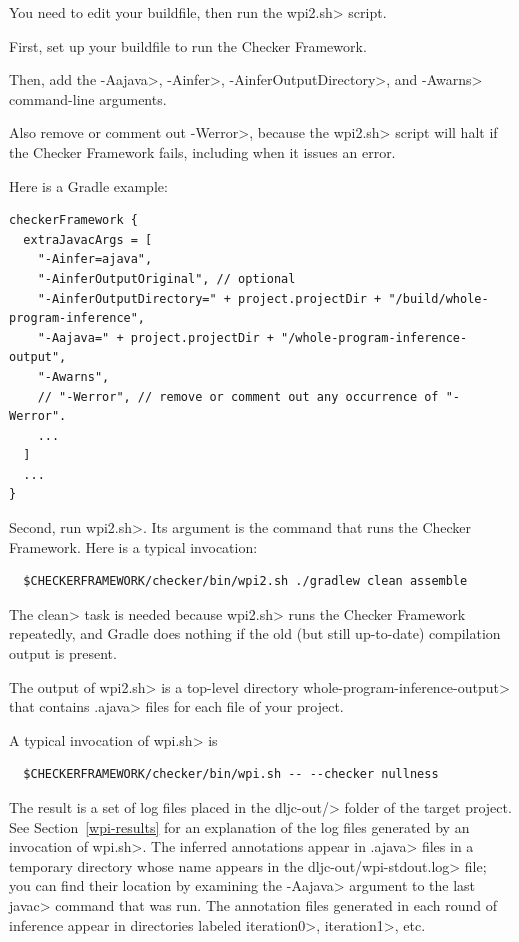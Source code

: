 You need to edit your buildfile, then run the \<wpi2.sh> script.



First, set up your buildfile to run the Checker Framework.

Then, add the
\<-Aajava>,
\<-Ainfer>,
\<-AinferOutputDirectory>, and
\<-Awarns> command-line arguments.

Also remove or comment out \<-Werror>, because the
\<wpi2.sh> script will halt if the Checker Framework fails, including when it
issues an error.

Here is a Gradle example:

\begin{Verbatim}
checkerFramework {
  extraJavacArgs = [
    "-Ainfer=ajava",
    "-AinferOutputOriginal", // optional
    "-AinferOutputDirectory=" + project.projectDir + "/build/whole-program-inference",
    "-Aajava=" + project.projectDir + "/whole-program-inference-output",
    "-Awarns",
    // "-Werror", // remove or comment out any occurrence of "-Werror".
    ...
  ]
  ...
}
\end{Verbatim}



Second, run \<wpi2.sh>.  Its argument is the command that runs the Checker Framework.
Here is a typical invocation:

\begin{Verbatim}
  $CHECKERFRAMEWORK/checker/bin/wpi2.sh ./gradlew clean assemble
\end{Verbatim}

The \<clean> task is needed because \<wpi2.sh> runs the Checker Framework
repeatedly, and Gradle does nothing if the old (but still up-to-date)
compilation output is present.

The output of \<wpi2.sh> is a top-level directory
\<whole-program-inference-output> that contains \<.ajava> files for each file of
your project.



A typical invocation of \<wpi.sh> is

\begin{Verbatim}
  $CHECKERFRAMEWORK/checker/bin/wpi.sh -- --checker nullness
\end{Verbatim}

The result is a set of log files placed in the \<dljc-out/> folder of the
target project.
See Section~\ref{wpi-results} for an explanation of the log files generated by
an invocation of \<wpi.sh>.
The inferred annotations appear in \<.ajava> files in a
temporary directory whose name appears in the \<dljc-out/wpi-stdout.log> file;
you can find their location by examining the \<-Aajava> argument
to the last \<javac> command that was run. The annotation files generated in
each round of inference appear in directories labeled \<iteration0>, \<iteration1>, etc.

